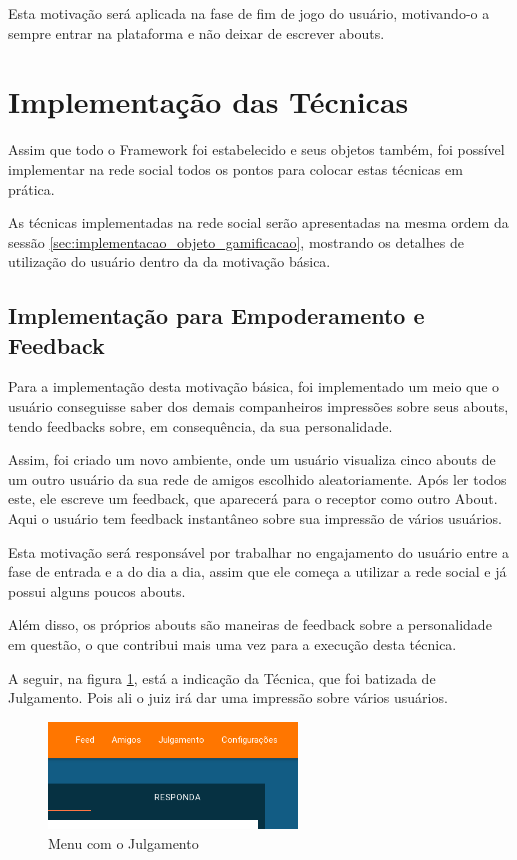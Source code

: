 Esta motivação será aplicada na fase de fim de jogo do usuário, motivando-o a sempre entrar na plataforma
e não deixar de escrever abouts.

\section{Implementação das Técnicas}
\label{sec:gamifição}
Assim que todo o Framework foi estabelecido e seus objetos também, foi possível implementar
na rede social todos os pontos para colocar estas técnicas em prática.

As técnicas implementadas na rede social serão apresentadas na mesma ordem da sessão
\ref{sec:implementacao_objeto_gamificacao}, mostrando os detalhes de utilização do usuário dentro
da da motivação básica.


\subsection{Implementação para Empoderamento e Feedback}
\label{sub:implementacao_empoderamento_feedback}
Para a implementação desta motivação básica, foi implementado um meio que o usuário conseguisse
saber dos demais companheiros impressões sobre seus abouts, tendo feedbacks sobre, em consequência,
da sua personalidade. 

Assim, foi criado um novo ambiente, onde um usuário visualiza cinco abouts de um outro usuário
da sua rede de amigos escolhido aleatoriamente. Após ler todos este, ele escreve um feedback, 
que aparecerá para o receptor como outro About. Aqui o usuário tem feedback instantâneo sobre
sua impressão de vários usuários. 

Esta motivação será responsável por trabalhar no engajamento do usuário entre a
fase de entrada e a do dia a dia, assim que ele começa a utilizar a rede social e já possui
alguns poucos abouts. 

Além disso, os próprios abouts são maneiras de feedback sobre a personalidade em questão, o
que contribui mais uma vez para a execução desta técnica.

A seguir, na figura \ref{fig:julgamento_menu}, está a indicação da Técnica, que foi batizada de Julgamento. Pois ali o juiz
irá dar uma impressão sobre vários usuários.

\begin{figure}[h]
    \centering
    \includegraphics[width=250px, scale=1]{figuras/julgamento_menu}
    \caption{Menu com o Julgamento}
    \label{fig:julgamento_menu}
\end{figure}


